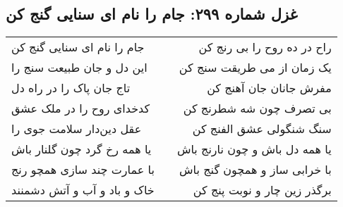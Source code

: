 \begin{center}
\section*{غزل شماره ۲۹۹: جام را نام ای سنایی گنج کن}
\label{sec:299}
\begin{longtable}{l p{0.5cm} r}
جام را نام ای سنایی گنج کن
&&
راح در ده روح را بی رنج کن
\\
این دل و جان طبیعت سنج را
&&
یک زمان از می طریقت سنج کن
\\
تاج جان پاک را در راه دل
&&
مفرش جانان جان آهنج کن
\\
کدخدای روح را در ملک عشق
&&
بی تصرف چون شه شطرنج کن
\\
عقل دین‌دار سلامت جوی را
&&
سنگ شنگولی عشق الفنج کن
\\
یا همه رخ گرد چون گلنار باش
&&
یا همه دل باش و چون نارنج باش
\\
با عمارت چند سازی همچو رنج
&&
با خرابی ساز و همچون گنج باش
\\
خاک و باد و آب و آتش دشمنند
&&
برگذر زین چار و نوبت پنج کن
\\
\end{longtable}
\end{center}
